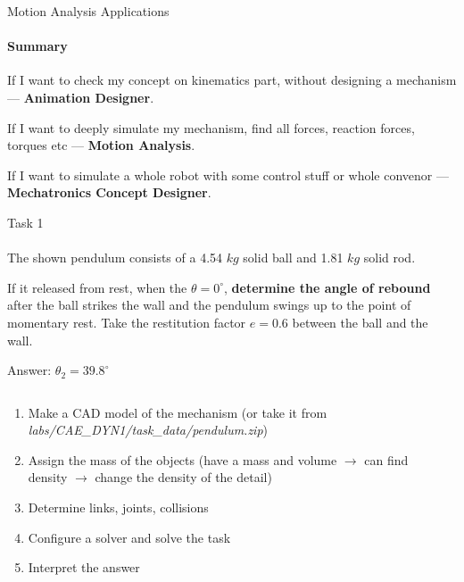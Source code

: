\documentclass[aspectratio=169]{beamer}
\begin{document}
\begin{frame}[t]{Motion Analysis Applications}
\framesubtitle{Summary}
\Large
\begin{center}
    If I want to check my concept on kinematics part, without designing a mechanism --- \textbf{Animation Designer}. \medskip

    If I want to deeply simulate my mechanism, find all forces, reaction forces, torques etc --- \textbf{Motion Analysis}. \medskip
    
    If I want to simulate a whole robot with some control stuff or whole convenor --- \textbf{Mechatronics Concept Designer}. 
\end{center}
\end{frame}

\begin{frame}[t]{Task 1}
\framesubtitle{}
\footnotesize
    The shown pendulum consists of a 4.54 $kg$ solid ball and 1.81 $kg$ solid rod.

    If it released from rest, when the $\theta = 0^\circ$, \textbf{determine the angle of rebound} after the ball strikes the wall and the pendulum swings up to the point of momentary rest. Take the restitution factor $e=0.6$ between the ball and the wall.
    \smallskip

    \alert{Answer}: $\theta_2 = 39.8^\circ$

    \begin{columns}[T,onlytextwidth]
        \begin{column}{0.49\textwidth}
            \begin{enumerate}
                \footnotesize
                \item Make a CAD model of the mechanism (or take it from \textit{labs/CAE\_DYN1/task\_data/pendulum.zip})
                \item Assign the mass of the objects (have a mass and volume $\rightarrow$ can find density $\rightarrow$ change the density of the detail)
                \item Determine links, joints, collisions
                \item Configure a solver and solve the task
                \item Interpret the answer
            \end{enumerate}
        \end{column}
        \begin{column}{0.49\textwidth}
            \vspace{-1.2cm}


\end{column}
\end{columns}
\end{frame}
\end{document}
